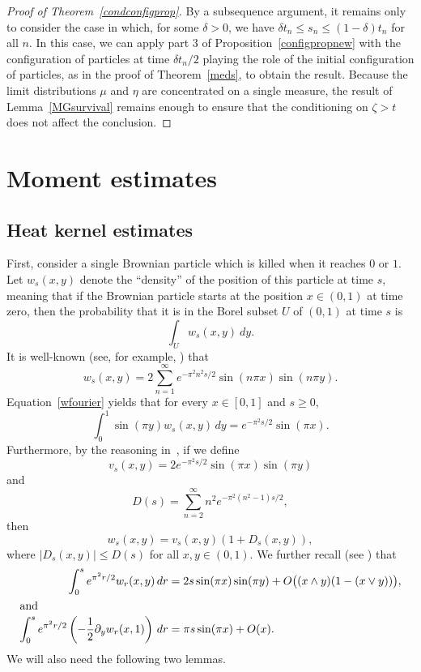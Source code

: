 \documentclass[AHL,Unicode,longabstracts,published]{cedram}
\newcommand{\1} {\mathds{1}}
\begin{document}
\begin{proof}[Proof of Theorem~\ref{condconfigprop}]
By a subsequence argument, it remains only to consider the case in which, for some $\delta > 0$, we have $\delta t_n \leq s_n \leq (1-\delta)t_n$ for all $n$. In this case, we can apply part 3 of Proposition~\ref{configpropnew} with the configuration of particles at time $\delta t_n/2$ playing the role of the initial configuration of particles, as in the proof of Theorem~\ref{meds}, to obtain the result. Because the limit distributions $\mu$ and $\eta$ are concentrated on a single measure, the result of Lemma~\ref{MGsurvival} remains enough to ensure that the conditioning on $\zeta > t$ does not affect the conclusion.
\end{proof}

\section{Moment estimates}\label{momsec}

\subsection{Heat kernel estimates} \label{sec:heat_kernel}

First, consider a single Brownian particle which is killed when it reaches $0$ or $1$. Let $w_s(x,y)$ denote the ``density'' of the position of this particle at time $s$, meaning that if the Brownian particle starts at the position $x \in (0, 1)$ at time zero, then the probability that it is in the Borel subset $U$ of $(0,1)$ at time $s$ is
\[
\int_U w_s(x,y) \: dy.
\]
It is well-known (see, for example, \cite[p.~188] {lawler}) that
\begin{equation}\label{wfourier}
w_s(x,y) = 2 \sum_{n=1}^{\infty} e^{-\pi^2 n^2 s/2} \sin (n \pi x) \sin (n \pi y).
\end{equation}
Equation~\eqref{wfourier} yields that for every $x\in[0,1]$ and $s\ge0$,
\begin{equation}\label{wsin}
\int_0^1 \sin(\pi y) w_s(x,y)\,dy = e^{-\pi^2 s/2}\sin(\pi x).
\end{equation}
Furthermore, by the reasoning in~\cite[Lemma~5]{bbs2}, if we define
\begin{equation}\label{vdef}
v_s(x,y) = 2 e^{-\pi^2 s/2} \sin(\pi x) \sin(\pi y)
\end{equation}
and
\begin{equation}\label{Ddef}
D(s) = \sum_{n=2}^{\infty} n^2 e^{-\pi^2 \left(n^2 - 1\right) s/2},
\end{equation}
then
\begin{equation}\label{udef}
w_s(x,y) = v_s(x,y)\left(1 + D_s(x,y)\right),
\end{equation}
where $|D_s(x,y)| \leq D(s)$ for all $x, y \in (0, 1)$. We further recall (see \cite[Lem\-ma~7.1]{maillard}) that
\begin{align}\label{wint}
\int_0^s e^{\pi^2 r/2}w_r(x,y)\,dr &= 2s\sin(\pi x)\sin(\pi y) + O\big((x\wedge y)(1-(x\vee y))\big),\\
\intertext{and}
\int_0^s e^{\pi^2 r/2}\left(-\frac 1 2 \partial_yw_r(x,1)\right)\,dr &= \pi s\sin(\pi x) + O(x).\label{wprimeint}
\end{align}
We will also need the following two lemmas.
\end{document}
